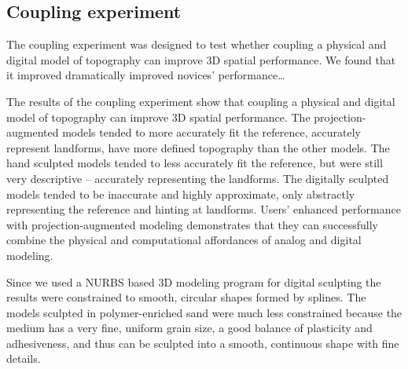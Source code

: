 \documentclass[prodmode,acmtochi]{acmsmall} %
\begin{document}




\subsection{Coupling experiment} %

%
The coupling experiment was designed to test whether 
coupling a physical and digital model of topography 
can improve 3D spatial performance. 
%
We found that it improved dramatically improved novices' performance\ldots









The results of the coupling experiment show that 
coupling a physical and digital model of topography 
can improve 3D spatial performance. 
%
The projection-augmented models tended
to more accurately fit the reference, 
accurately represent landforms, 
have more defined topography
than the other models. 
%
The hand sculpted models tended
to less accurately fit the reference, but
were still very descriptive 
-- accurately representing the landforms. 
%
The digitally sculpted models tended
to be inaccurate and highly approximate,
only abstractly representing the reference
and hinting at landforms. 
%
Users' enhanced performance with projection-augmented modeling 
demonstrates that they can successfully 
combine the physical and computational affordances 
of analog and digital modeling. 

Since we used a NURBS based 3D modeling program 
for digital sculpting
the results were constrained to smooth, circular shapes %
formed by splines.
%
%
The models sculpted in polymer-enriched sand 
were much less constrained 
because the medium has a very fine, uniform grain size,
a good balance of plasticity and adhesiveness,
and thus can be sculpted into a smooth, continuous shape
with fine details.
\end{document}
